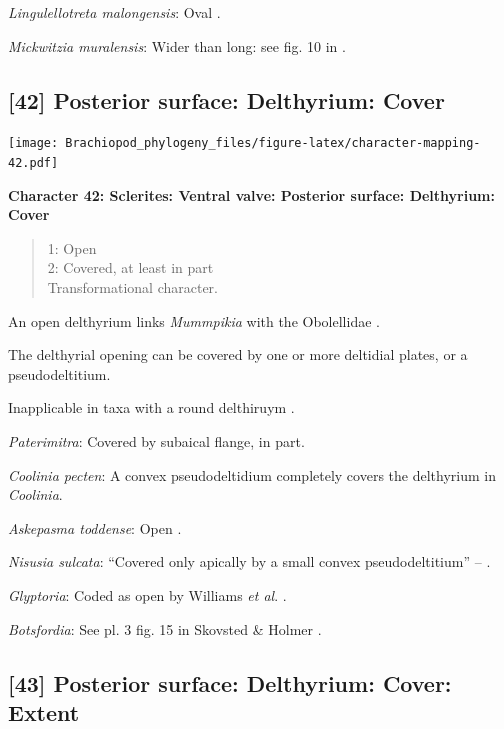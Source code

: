 \documentclass[openany]{book}
\theoremstyle{definition}
\theoremstyle{definition}
\theoremstyle{definition}
\theoremstyle{remark}
\begin{document}
\emph{Lingulellotreta malongensis}: Oval
\citep{Williams2000BrachiopodaLinguliformea}.

\emph{Mickwitzia muralensis}: Wider than long: see fig. 10 in
\citet{Balthasar2004Shellstructure}.

\hypertarget{posterior-surface-delthyrium-cover}{%
\subsection*{{[}42{]} Posterior surface: Delthyrium:
Cover}\label{posterior-surface-delthyrium-cover}}

\texttt{[image: Brachiopod\_phylogeny\_files/figure-latex/character-mapping-42.pdf]}

\textbf{Character 42: Sclerites: Ventral valve: Posterior surface:
Delthyrium: Cover}

\begin{quote}
1: Open\\
2: Covered, at least in part\\
Transformational character.
\end{quote}

An open delthyrium links \emph{Mummpikia} with the Obolellidae
\citep{Balthasar2008iMummpikia}.

The delthyrial opening can be covered by one or more deltidial plates,
or a pseudodeltitium.

Inapplicable in taxa with a round delthiruym \citep[generated by
overgrowth of the delthyrial opening by posterolateral parts of the
shell, per][]{Popov1992TheCambrian}.

\emph{Paterimitra}: Covered by subaical flange, in part.

\emph{Coolinia pecten}: A convex pseudodeltidium completely covers the
delthyrium in \emph{Coolinia}.

\emph{Askepasma toddense}: Open \citep{Topper2013Theoldest}.

\emph{Nisusia sulcata}: ``Covered only apically by a small convex
pseudodeltitium'' -- \citet{Holmer2018Evolutionarysignificance}.

\emph{Glyptoria}: Coded as open by Williams \emph{et al}.
\citeyearpar{Williams1998Thediversity}.

\emph{Botsfordia}: See pl. 3 fig. 15 in Skovsted \& Holmer
\citeyearpar{Skovsted2005EarlyCambrian}.

\hypertarget{posterior-surface-delthyrium-cover-extent}{%
\subsection*{{[}43{]} Posterior surface: Delthyrium: Cover:
Extent}\label{posterior-surface-delthyrium-cover-extent}}
\end{document}
